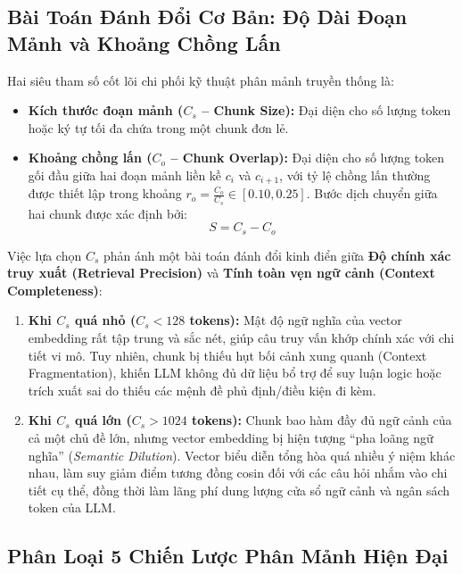 \documentclass[12pt,a4paper]{report}
\begin{document}
\subsection{Bài Toán Đánh Đổi Cơ Bản: Độ Dài Đoạn Mảnh và Khoảng Chồng Lấn}

Hai siêu tham số cốt lõi chi phối kỹ thuật phân mảnh truyền thống là:
\begin{itemize}[itemsep=2pt, parsep=0pt, topsep=3pt]
    \item \textbf{Kích thước đoạn mảnh ($C_s$ -- Chunk Size):} Đại diện cho số lượng token hoặc ký tự tối đa chứa trong một chunk đơn lẻ.
    \item \textbf{Khoảng chồng lấn ($C_o$ -- Chunk Overlap):} Đại diện cho số lượng token gối đầu giữa hai đoạn mảnh liền kề $c_i$ và $c_{i+1}$, với tỷ lệ chồng lấn thường được thiết lập trong khoảng $r_o = \frac{C_o}{C_s} \in [0.10, 0.25]$. Bước dịch chuyển giữa hai chunk được xác định bởi:
    \begin{equation}
        S = C_s - C_o
    \end{equation}
\end{itemize}

Việc lựa chọn $C_s$ phản ánh một bài toán đánh đổi kinh điển giữa \textbf{Độ chính xác truy xuất (Retrieval Precision)} và \textbf{Tính toàn vẹn ngữ cảnh (Context Completeness)}:
\begin{enumerate}[itemsep=2pt, parsep=0pt, topsep=3pt]
    \item \textbf{Khi $C_s$ quá nhỏ ($C_s < 128$ tokens):} Mật độ ngữ nghĩa của vector embedding rất tập trung và sắc nét, giúp câu truy vấn khớp chính xác với chi tiết vi mô. Tuy nhiên, chunk bị thiếu hụt bối cảnh xung quanh (Context Fragmentation), khiến LLM không đủ dữ liệu bổ trợ để suy luận logic hoặc trích xuất sai do thiếu các mệnh đề phủ định/điều kiện đi kèm.
    \item \textbf{Khi $C_s$ quá lớn ($C_s > 1024$ tokens):} Chunk bao hàm đầy đủ ngữ cảnh của cả một chủ đề lớn, nhưng vector embedding bị hiện tượng “pha loãng ngữ nghĩa” (\textit{Semantic Dilution}). Vector biểu diễn tổng hòa quá nhiều ý niệm khác nhau, làm suy giảm điểm tương đồng cosin đối với các câu hỏi nhắm vào chi tiết cụ thể, đồng thời làm lãng phí dung lượng cửa sổ ngữ cảnh và ngân sách token của LLM.
\end{enumerate}

\subsection{Phân Loại 5 Chiến Lược Phân Mảnh Hiện Đại}
\end{document}
